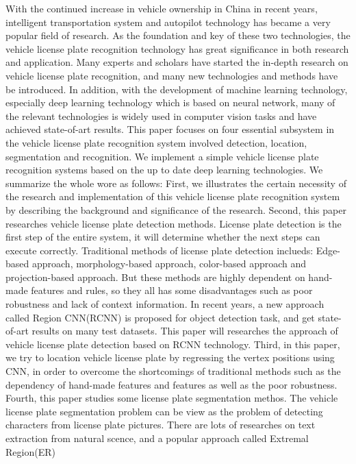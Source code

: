 \begin{enabstract}
With the continued increase in vehicle ownership in China in recent years,
intelligent transportation system and autopilot technology has became a very
popular field of research. As the foundation and key of these two technologies,
the vehicle license plate recognition technology has great significance in both
research and application. Many experts and scholars have started the in-depth
research on vehicle license plate recognition, and many new technologies and
methods have be introduced. In addition, with the development of machine
learning technology, especially deep learning technology which is based on
neural network, many of the relevant technologies is widely used in computer
vision tasks and have achieved state-of-art results. This paper focuses on four
essential subsystem in the vehicle license plate recognition system involved
detection, location, segmentation and recognition. We implement a simple vehicle
license plate recognition systems based on the up to date deep learning
technologies. We summarize the whole wore as follows:
First, we illustrates the certain necessity of the research and implementation
of this vehicle license plate recognition system by describing the background and
significance of the research.
Second, this paper researches vehicle license plate detection methods.
License plate detection is the first step of the entire system, it will
determine whether the next steps can execute correctly. Traditional methods of
license plate detection inclueds: Edge-based approach, morphology-based
approach, color-based approach and projection-based approach. But these methods
are highly dependent on hand-made features and rules, so they all has some
disadvantages such as poor robustness and lack of context information. In recent
years, a new approach called Region CNN(RCNN) is proposed for object detection
task, and get state-of-art results on many test datasets. This paper will
researches the approach of vehicle license plate detection based on RCNN
technology.
Third, in this paper, we try to location vehicle license plate by regressing the
vertex positions using CNN, in order to overcome the shortcomings of traditional
methods such as the dependency of hand-made features and features as well as the
poor robustness.
Fourth, this paper studies some license plate segmentation methos. The vehicle
license plate segmentation problem can be view as the problem of detecting
characters from license plate pictures. There are lots of researches on text
extraction from natural scence, and a popular approach called Extremal Region(ER)

\end{enabstract}
